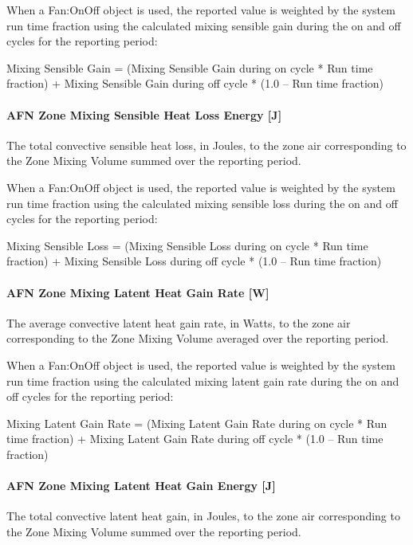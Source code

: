 When a Fan:OnOff object is used, the reported value is weighted by the system run time fraction using the calculated mixing sensible gain during the on and off cycles for the reporting period:

Mixing Sensible Gain = (Mixing Sensible Gain during on cycle * Run time fraction) + Mixing Sensible Gain during off cycle * (1.0 -- Run time fraction)

\paragraph{AFN Zone Mixing Sensible Heat Loss Energy {[}J{]}}\label{afn-zone-mixing-sensible-heat-loss-energy-j}

The total convective sensible heat loss, in Joules, to the zone air corresponding to the Zone Mixing Volume summed over the reporting period.

When a Fan:OnOff object is used, the reported value is weighted by the system run time fraction using the calculated mixing sensible loss during the on and off cycles for the reporting period:

Mixing Sensible Loss = (Mixing Sensible Loss during on cycle * Run time fraction) + Mixing Sensible Loss during off cycle * (1.0 -- Run time fraction)

\paragraph{AFN Zone Mixing Latent Heat Gain Rate {[}W{]}}\label{afn-zone-mixing-latent-heat-gain-rate-w}

The average convective latent heat gain rate, in Watts, to the zone air corresponding to the Zone Mixing Volume averaged over the reporting period.

When a Fan:OnOff object is used, the reported value is weighted by the system run time fraction using the calculated mixing latent gain rate during the on and off cycles for the reporting period:

Mixing Latent Gain Rate = (Mixing Latent Gain Rate during on cycle * Run time fraction) + Mixing Latent Gain Rate during off cycle * (1.0 -- Run time fraction)

\paragraph{AFN Zone Mixing Latent Heat Gain Energy {[}J{]}}\label{afn-zone-mixing-latent-heat-gain-energy-j}

The total convective latent heat gain, in Joules, to the zone air corresponding to the Zone Mixing Volume summed over the reporting period.


